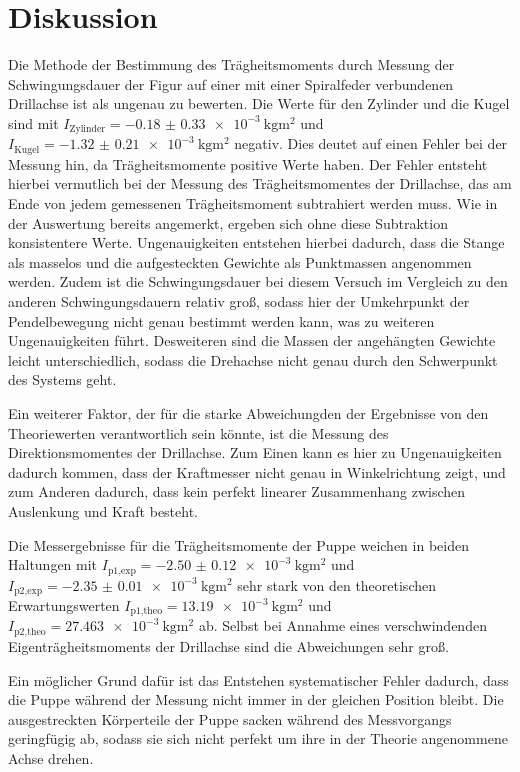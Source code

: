 \newpage
\section{Diskussion}
\label{sec:Diskussion}

Die Methode der Bestimmung des Trägheitsmoments durch Messung der Schwingungsdauer
der Figur auf einer mit einer Spiralfeder verbundenen Drillachse ist als ungenau
zu bewerten.
Die Werte für den Zylinder und die Kugel sind mit $I_{\text{Zylinder}} = \SI{-0.18(033)e-3}{\kilogram\meter\squared}$
und $I_{\text{Kugel}}=\SI{-1.32(021)e-3}{\kilogram\meter\squared}$ negativ. Dies
deutet auf einen Fehler bei der Messung hin, da Trägheitsmomente positive Werte haben. Der Fehler entsteht
hierbei vermutlich bei der Messung des Trägheitsmomentes der Drillachse, das am Ende
von jedem gemessenen Trägheitsmoment subtrahiert werden muss. Wie in der Auswertung
bereits angemerkt, ergeben sich ohne diese Subtraktion konsistentere Werte. Ungenauigkeiten entstehen
hierbei dadurch, dass die Stange als masselos und die aufgesteckten Gewichte als
Punktmassen angenommen werden. Zudem ist die Schwingungsdauer bei diesem Versuch
im Vergleich zu den anderen Schwingungsdauern relativ groß, sodass hier der Umkehrpunkt
der Pendelbewegung nicht genau bestimmt werden kann, was zu weiteren Ungenauigkeiten führt.
Desweiteren sind die Massen der angehängten Gewichte leicht unterschiedlich, sodass
die Drehachse nicht genau durch den Schwerpunkt des Systems geht.

Ein weiterer Faktor, der für die starke Abweichungden der Ergebnisse von den
Theoriewerten verantwortlich sein könnte, ist die Messung des Direktionsmomentes
der Drillachse. Zum Einen kann es hier zu Ungenauigkeiten dadurch kommen, dass der
Kraftmesser nicht genau in Winkelrichtung zeigt, und zum
Anderen dadurch, dass kein perfekt linearer Zusammenhang zwischen Auslenkung und Kraft
besteht.

Die Messergebnisse für die Trägheitsmomente der Puppe weichen in beiden Haltungen
mit $I_{\text{p1,exp}} = \SI{-2.50(012)e-3}{\kilogram\meter\squared}$ und
$I_{\text{p2,exp}} = \SI{-2.35(001)e-3}{\kilogram\meter\squared}$
sehr stark von den theoretischen Erwartungswerten $I_{\text{p1,theo}} = \SI{13.19e-3}{\kilogram\meter\squared}$
und $I_{\text{p2,theo}} = \SI{27.463e-3}{\kilogram\meter\squared}$ ab. Selbst bei
Annahme eines verschwindenden Eigenträgheitsmoments der Drillachse sind die Abweichungen
sehr groß.

Ein möglicher Grund dafür ist das Entstehen systematischer Fehler dadurch,
dass die Puppe während der Messung nicht immer in der gleichen Position bleibt. Die ausgestreckten
Körperteile der Puppe sacken während des Messvorgangs geringfügig ab, sodass sie sich
nicht perfekt um ihre in der Theorie angenommene Achse drehen.

